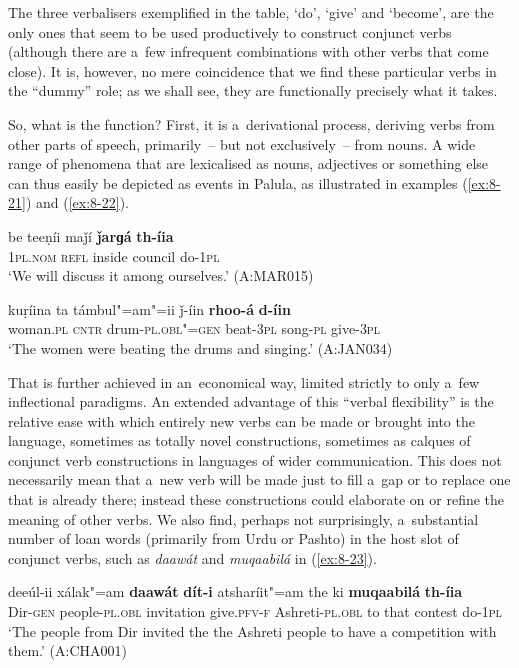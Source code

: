 The three verbalisers exemplified in the table, `do', `give' and `become', are the only ones that seem to be used productively to construct conjunct verbs (although there are a~few infrequent combinations with other verbs that come close). It is, however, no mere coincidence that we find these particular verbs in the ``dummy'' role; as we shall see, they are functionally precisely what it takes. 


So, what is the function? First, it is a~derivational process, deriving verbs from other parts of speech, primarily~-- but not exclusively~-- from nouns. A wide range of phenomena that are lexicalised as nouns, adjectives or something else can thus easily be depicted as events in Palula, as illustrated in examples (\ref{ex:8-21}) and (\ref{ex:8-22}). 

\begin{exe}
\ex
\label{ex:8-21}
\gll be teeṇíi maǰí \textbf{ǰarɡá} \textbf{th-íia} \\
\textsc{1}\textsc{pl.nom} \textsc{refl} inside council do-\textsc{1pl} \\
\glt `We will discuss it among ourselves.' (A:MAR015)
\end{exe}
\begin{exe}
\ex
\label{ex:8-22}
\gll kuṛíina ta támbul"=am"=ii ǰ-íin \textbf{rhoo-á} \textbf{d-íin} \\
woman.\textsc{pl} \textsc{cntr} drum-\textsc{pl.obl"=gen} beat-\textsc{3pl} song-\textsc{pl} give-\textsc{3pl}\\
\glt `The women were beating the drums and singing.' (A:JAN034)
\end{exe}

That is further achieved in an~economical way, limited strictly to only a~few inflectional paradigms. An extended advantage of this ``verbal flexibility'' is the relative ease with which entirely new verbs can be made or brought into the language, sometimes as totally novel constructions, sometimes as calques of conjunct verb constructions in languages of wider communication. This does not necessarily mean that a~new verb will be made just to fill a~gap or to replace one that is already there; instead these constructions could elaborate on or refine the meaning of other verbs. We also find, perhaps not surprisingly, a~substantial number of loan words (primarily from Urdu or Pashto) in the host slot of conjunct verbs, such as \textit{daawát} and \textit{muqaabilá} in (\ref{ex:8-23}).

\ea
\label{ex:8-23}
\gll deeúl-ii xálak"=am \textbf{daawát} \textbf{dít-i} atsharíit"=am the ki \textbf{muqaabilá} \textbf{th-íia}\\
Dir-\textsc{gen} people-\textsc{pl.obl} invitation give.\textsc{pfv-f} Ashreti-\textsc{pl.obl} to that contest do-\textsc{1pl}\\
\glt `The people from Dir invited the the Ashreti people to have a competition with them.' (A:CHA001)
\z

